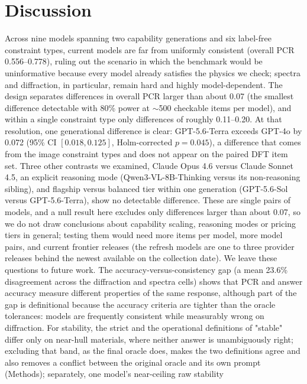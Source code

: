 \documentclass[pdflatex,sn-nature]{sn-jnl}
\newcommand{\rev}[1]{#1}
\newcommand{\rev}[1]{{\color{blue}#1}}
\begin{document}
\section*{Discussion}
Across nine models spanning two capability generations and six label-free constraint
types, current models are far from
uniformly consistent (overall PCR \rev{0.556--0.778}), ruling out the scenario in which the
benchmark would be uninformative because every model already satisfies the physics we
check; spectra and diffraction, in particular, remain hard and highly model-dependent. \rev{The
design separates differences in overall PCR larger than about 0.07 (the smallest difference
detectable with 80\% power at $\sim$500 checkable items per model), and within a single constraint
type only differences of roughly 0.11--0.20. At that resolution, one generational difference is
clear: GPT-5.6-Terra exceeds GPT-4o by 0.072 (95\% CI $[0.018,0.125]$, Holm-corrected $p=0.045$), a
difference that comes from the image constraint types and does not appear on the paired DFT item set.
Three other contrasts we examined, Claude Opus 4.6 versus Claude Sonnet 4.5, an explicit reasoning
mode (Qwen3-VL-8B-Thinking versus its non-reasoning sibling), and flagship versus balanced tier
within one generation (GPT-5.6-Sol versus GPT-5.6-Terra), show no detectable difference. These are
single pairs of models, and a null result here excludes only differences larger than about 0.07,
so we do not draw conclusions about capability scaling, reasoning modes or pricing tiers in general;
testing them would need more items per model, more model pairs, and current frontier releases (the
refresh models are one to three provider releases behind the newest available on the collection
date). We leave these questions to future work.} The accuracy-versus-consistency gap (a mean \rev{23.6\%
disagreement across the diffraction and spectra cells}) \rev{shows
that PCR and answer accuracy measure different properties of the same response}\rev{, although part of
the gap is definitional because the accuracy criteria are tighter than the oracle tolerances}: models are frequently
consistent while measurably wrong on diffraction\rev{. For stability, the strict and the operational
definitions of "stable" differ only on near-hull materials, where neither answer is unambiguously right;
excluding that band, as the final oracle does, makes the two definitions agree and also removes a conflict
between the original oracle and its own prompt (Methods)}; separately, one model's near-ceiling raw stability
\end{document}
